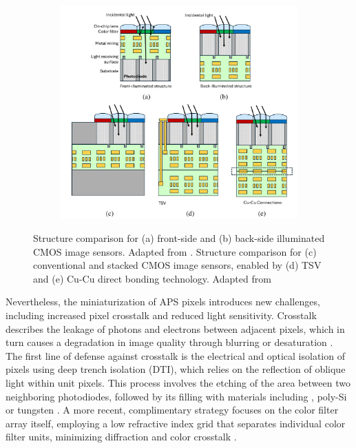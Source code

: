 \begin{figure}[htbp]
    \centering
    \begin{subfigure}[t]{0.99\textwidth} %
        \centering
        \includegraphics[width=\textwidth]{chapters/introduction/image/front_back_side_and_stacking.pdf} 
    \end{subfigure}
    \caption[Technological breakthroughs for the reduction of the APS area.]{Structure comparison for (a) front-side and (b) back-side illuminated CMOS image sensors. Adapted from \cite{SONY2008SonyNoise}. Structure comparison for (c) conventional and stacked CMOS image sensors, enabled by (d) TSV and (e) Cu-Cu direct bonding technology. Adapted from \cite{Kagawa20193DSensors}}
    \label{fig:ch1:backside_and_stacking}
\end{figure}

Nevertheless, the miniaturization of APS pixels introduces new challenges, including increased pixel crosstalk and reduced light sensitivity. Crosstalk describes the leakage of photons and electrons between adjacent pixels, which in turn causes a degradation in image quality through blurring or desaturation \cite{Kim2022CrosstalkDeconvolution}. The first line of defense against crosstalk is the electrical and optical isolation of pixels using deep trench isolation (DTI), which relies on the reflection of oblique light within unit pixels. This process involves the etching of the area between two neighboring photodiodes, followed by its filling with materials including , poly-Si or tungsten \cite{Ahn2014AGate, Okawa2019ALevel, Kim2020ATechnology, Park20217.9Isolation}. A more recent, complimentary strategy focuses on the color filter array itself, employing a low refractive index grid that separates individual color filter units, minimizing diffraction and color crosstalk \cite{Han_Lin1.1umImprovement}.

